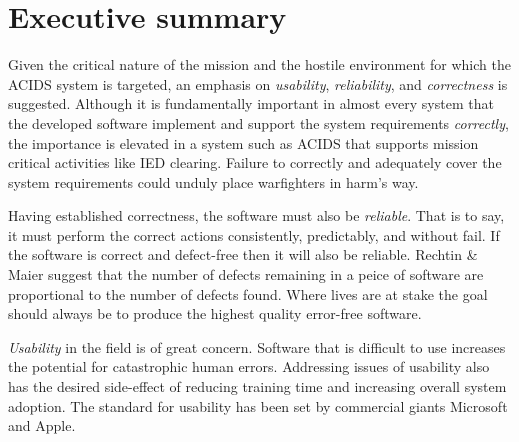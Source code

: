 \documentclass[letterpaper,10pt]{article}
\begin{document}
\section{Executive summary}
Given the critical nature of the mission and the hostile environment for which the ACIDS system is targeted, an emphasis on \emph{usability}, \emph{reliability}, and \emph{correctness} is suggested. Although it is fundamentally important in almost every system that the developed software implement and support
the system requirements \emph{correctly}, the importance is elevated in a system such as ACIDS that supports
mission critical activities like IED clearing.  Failure to correctly and adequately cover the system requirements could unduly place warfighters in harm's way.
\par
Having established correctness, the software must also be \emph{reliable}. That is to say, it must perform the correct
actions consistently, predictably, and without fail.  If the software is correct and defect-free then it will also be reliable.  Rechtin \& Maier suggest that the number of defects remaining in a peice of software are proportional to the number of defects found.  Where lives are at stake the goal should always be to produce the highest quality error-free software.
\par
\emph{Usability} in the field is of great concern.  Software that is difficult to use increases the potential for catastrophic human errors. Addressing issues of usability  also has the desired side-effect of reducing training time and increasing overall system adoption.  The standard for usability has been set by commercial giants Microsoft and Apple.
\end{document}
